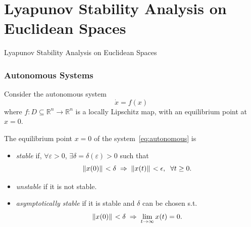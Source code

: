 \section{Lyapunov Stability Analysis on Euclidean Spaces}

\begin{frame}
    Lyapunov Stability Analysis on Euclidean Spaces


\end{frame}

\begingroup
\small

\begin{frame}
    \frametitle{Autonomous Systems}

    Consider the autonomous system 
    \begin{equation}
        \dot{x} = f(x)
        \label{eq:autonomous}
    \end{equation}
    where $f: D \subseteq \mathbb{R}^n \rightarrow \mathbb{R}^n$ is a locally
    Lipschitz map, with an equilibrium point at $x = 0$.

    \begin{definition}
        The equilibrium point $x=0$ of the system~\eqref{eq:autonomous} is
        \begin{itemize}
            \item \textit{stable} if, $\forall \varepsilon > 0$, $\exists \delta
            = \delta(\varepsilon) > 0$ such that 
            \[
                \|{x(0)}\|_{{}_{}} < \delta \; \Rightarrow \; \|{x(t)}\|_{{}_{}} < 
                \epsilon, \; \; \forall t \geq 0.
            \]
            \item \textit{unstable} if it is not stable.
            \item \textit{asymptotically stable} if it is stable and $\delta$
            can be chosen s.t.
            \[ \|{x(0)}\|_{{}_{}} < \delta \; \Rightarrow \; \lim_{t \to \infty} x(t)
            = 0. \]
        \end{itemize}
    \end{definition}
\end{frame}


